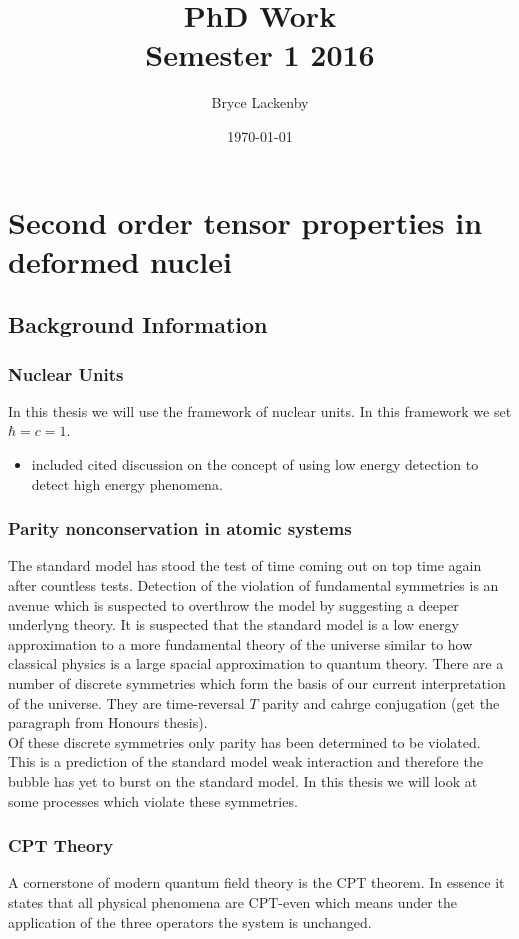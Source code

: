 \documentclass[10pt,a4paper]{report}
\begin{document}
\doublespacing
\title{PhD Work \\
Semester 1 2016}
\date{\today}
\author{Bryce Lackenby}

\maketitle
\part{Second order tensor properties in deformed nuclei}

\chapter{Background Information}
\section{Nuclear Units}
In this thesis we will use the framework of nuclear units. In this framework we set $\hbar = c = 1$. 
\begin{itemize}
\item included cited discussion on the concept of using low energy detection to detect high energy phenomena.
\end{itemize}
\section{Parity nonconservation in atomic systems}
The standard model has stood the test of time coming out on top time again after countless tests. Detection of the violation of fundamental symmetries is an avenue which is suspected to overthrow the model by suggesting a deeper underlyng theory. It is suspected that the standard model is a low energy approximation to a more fundamental theory of the universe similar to how classical physics is a large spacial approximation to quantum theory. There are a number of discrete symmetries which form the basis of our current interpretation of the universe. They are time-reversal $T$ parity and cahrge conjugation (get the paragraph from Honours thesis). \\

Of these discrete symmetries only parity has been determined to be violated. This is a prediction of the standard model weak interaction and therefore the bubble has yet to burst on the standard model. In this thesis we will look at some processes which violate these symmetries. 
\section{CPT Theory}
A cornerstone of modern quantum field theory is the CPT theorem. In essence it states that all physical phenomena are CPT-even which means under the application of the three operators the system is unchanged. \cite{LandauVol4}
\end{document}
